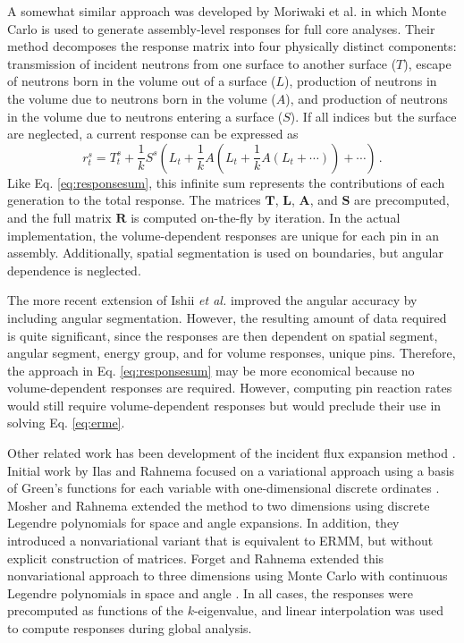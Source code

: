 A somewhat similar approach was developed by 
Moriwaki et al. \cite{moriwaki1999ndc}
in which Monte Carlo is used to 
generate assembly-level responses for full core analyses. 
Their method decomposes the response
matrix into four physically distinct components: 
transmission of incident neutrons from one surface to another surface ($T$), 
escape of neutrons born in the volume out of a surface ($L$), 
production of neutrons in the volume due to neutrons born in the 
volume ($A$), and production of neutrons in the volume due to neutrons 
entering a surface ($S$). If all indices but the 
surface are neglected, a current response can be expressed as
\begin{equation}
 r^{s}_{t} = T^s_t + \frac{1}{k}S^s(L_t + \frac{1}{k}A(L_t 
                   + \frac{1}{k}A(L_t + \cdots )) + \cdots) \, .
\label{eq:responseiterate}
\end{equation}
Like Eq. \ref{eq:responsesum}, this infinite sum 
represents the contributions of each generation to the 
total response.  The
matrices $\mathbf{T}$, $\mathbf{L}$, $\mathbf{A}$, and $\mathbf{S}$ 
are precomputed, and the full matrix $\mathbf{R}$ is
computed on-the-fly by iteration.  In the actual implementation, the 
volume-dependent responses are unique for each pin in an assembly.  
Additionally, spatial segmentation is used on boundaries, but angular 
dependence is neglected.

The more recent extension of Ishii {\it et al.} improved the 
angular accuracy by including angular segmentation. 
However, the resulting amount of data required
is quite significant, since the responses are then
dependent on spatial segment, angular segment, energy
group, and for volume responses, unique pins.
Therefore,  the approach in Eq. \ref{eq:responsesum} may be more 
economical because no volume-dependent responses are required.
However, computing pin reaction rates would still require 
volume-dependent responses but would preclude their use in 
solving Eq. \ref{eq:erme}.

Other related work has been development of the incident
flux expansion method \cite{ilas2003hcm,mosher2006ifr}. 
Initial work by Ilas and Rahnema focused on a variational
approach using a basis of Green's functions
for each variable with one-dimensional discrete 
ordinates \cite{ilas2003hcm}.  Mosher and Rahnema extended the 
method to two dimensions using discrete Legendre polynomials 
for space and angle expansions.  In addition, they
introduced a nonvariational variant that is equivalent to ERMM, but 
without explicit construction of matrices.  Forget and Rahnema
 extended this nonvariational approach to
three dimensions using Monte Carlo  with continuous
Legendre polynomials in space and angle \cite{forget2006tdh}.
In all cases, the responses were precomputed as functions
of the $k$-eigenvalue, and linear interpolation was
used to compute responses during global analysis.

